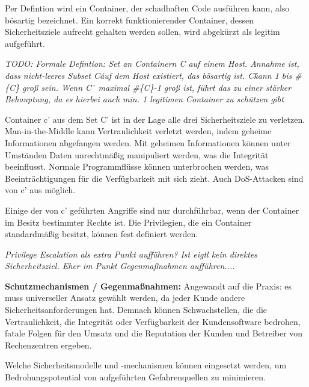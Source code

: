 \documentclass[../main.tex]{subfiles}
\begin{document}
  Per Defintion wird ein Container, der schadhaften Code ausführen kann, also bösartig bezeichnet. Ein korrekt funktionierender Container, dessen Sicherheitsziele aufrecht gehalten werden sollen, wird abgekürzt als legitim aufgeführt.

  \emph{TODO: Formale Defintion: Set an Containern C auf einem Host. Annahme ist, dass nicht-leeres Subset C\' auf dem Host existiert, das bösartig ist. C\' kann 1 bis \#\{C\} groß sein. Wenn C'\ maximal \#\{C\}-1 groß ist, führt das zu einer stärker Behauptung, da es hierbei auch min. 1 legitimen Container zu schützen gibt}

  Container c' aus dem Set C' ist in der Lage alle drei Sicherheitsziele zu verletzen. Man-in-the-Middle kann Vertraulichkeit verletzt werden, indem geheime Informationen abgefangen werden. Mit geheimen Informationen können unter Umständen Daten unrechtmäßig manipuliert werden, was die Integrität beeinflusst. Normale Programmflüsse können unterbrochen werden, was Beeinträchtigungen für die Verfügbarkeit mit sich zieht. Auch DoS-Attacken sind von c' aus möglich.

  Einige der von c' geführten Angriffe sind nur durchführbar, wenn der Container im Besitz bestimmter Rechte ist. Die Privilegien, die ein Container standardmäßig besitzt, können fest definiert werden.

  \emph{Privilege Escalation als extra Punkt aufführen? Ist eigtl kein direktes Sicherheitsziel. Eher im Punkt Gegenmaßnahmen aufführen....}


  \textbf{Schutzmechanismen / Gegenmaßnahmen:} %
  Angewandt auf die Praxis: es muss universeller Ansatz gewählt werden, da jeder Kunde andere Sicherheitsanforderungen hat. Demnach können Schwachstellen, die die Vertraulichkeit, die Integrität oder Verfügbarkeit der Kundensoftware bedrohen, fatale Folgen für den Umsatz und die Reputation der Kunden und Betreiber von Rechenzentren ergeben.

  Welche Sicherheitsmodelle und -mechanismen können eingesetzt werden, um Bedrohungspotential von aufgeführten Gefahrenquellen zu minimieren.
\end{document}
